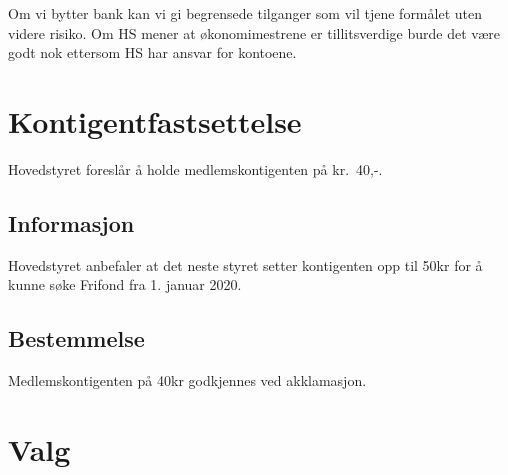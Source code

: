 \documentclass[10pt,norsk,a4paper]{article}
\begin{document}
Om vi bytter bank kan vi gi begrensede tilganger som vil tjene formålet uten videre risiko. Om HS mener at økonomimestrene er tillitsverdige burde det være godt nok ettersom HS har ansvar for kontoene.

\section{Kontigentfastsettelse}
Hovedstyret foreslår å holde medlemskontigenten på kr.~40,-.
\subsection{Informasjon}
Hovedstyret anbefaler at det neste styret setter kontigenten opp til 50kr for å kunne søke Frifond fra 1. januar 2020.
\subsection{Bestemmelse}
Medlemskontigenten på 40kr godkjennes ved akklamasjon.

\newpage

\section{Valg}
\end{document}
